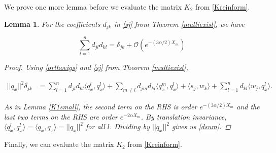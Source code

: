 \documentclass[12pt]{article}
\newtheorem{lemma}{Lemma}
\begin{document}
We prove one more lemma before we evaluate the matrix $K_2$ from \eqref{Kreinform}.


\begin{lemma}\label{orthogonald}
For the coefficients $d_{jk}$ in \eqref{sj} from Theorem \ref{multiexist}, we have

\begin{equation}\label{dsum}
\sum_{l = 1}^{n} d_{jl} d_{kl} = \delta_{jk} + \mathcal{O}(e^{-(3 \alpha/2) X_m})
\end{equation}

\begin{proof}
Using \eqref{orthoeigs} and \eqref{sj} from Theorem \ref{multiexist},

\begin{align*}
||q_x||^2 \delta_{jk}
&= \sum_{l = 1}^{n} d_{jl} d_{kl} \langle q^l_x, q^l_{x} \rangle 
+ \sum_{m \neq l} d_{jm} d_{kl} \langle q^m_x, q^l_{x} \rangle 
+ \langle s_j, w_k \rangle 
+ \sum_{l = 1}^{n} d_{kl} \langle w_j, q^l_{x} \rangle.
\end{align*}

As in Lemma \ref{K1small}, the second term on the RHS is order $e^{-(3 \alpha/2) X_m}$ and the last two terms on the RHS are order $e^{-2 \alpha X_m}$. By translation invariance, $\langle q^l_x, q^l_{x} \rangle = \langle q_x, q_{x} \rangle = ||q_x||^2$ for all $l$. Dividing by $||q_x||^2$ gives us \eqref{dsum}.

\end{proof}
\end{lemma}

Finally, we can evaluate the matrix $K_2$ from \eqref{Kreinform}.

\end{document}
